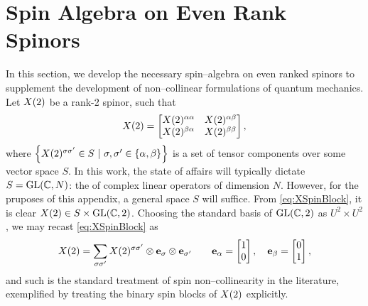 \chapter{Spin Algebra on Even Rank Spinors}
\label{apx:SpinorOp}

In this section, we develop the necessary spin--algebra on even ranked spinors to supplement the development 
of non--collinear formulations of quantum mechanics.
Let $\spinor{2}{X}$ be a rank-2 spinor, such that
\begin{equation}
\label{eq:XSpinBlock}
\spinor{2}{X} = 
  \begin{bmatrix}
    \spinor{2}{X}^{\alpha\alpha} & \spinor{2}{X}^{\alpha\beta} \\
    \spinor{2}{X}^{\beta\alpha}  & \spinor{2}{X}^{\beta\beta} \\
  \end{bmatrix}, 
\end{equation}
where $\left\lbrace\spinor{2}{X}^{\sigma\sigma'} \in S
\text{ }\vert\text{ } \sigma,\sigma' \in \{\alpha,\beta\} \right\rbrace$ is a
set of tensor components over some vector space $S$. In this work, the state of affairs will
typically dictate $S = \GL{C}{N}$: the  of complex linear operators of dimension $N$. However, 
for the pruposes of this appendix, a general space $S$ will suffice. From \cref{eq:XSpinBlock}, 
it is clear $\spinor{2}{X} \in S \times \GL{C}{2}$.
Choosing the standard basis of $\GL{C}{2}$ as $U^2 \times U^2$,
we may recast \cref{eq:XSpinBlock} as
\begin{equation}
\label{eq:XSpinComp}
  \spinor{2}{X} = \sum_{\sigma\sigma'} \spinor{2}{X}^{\sigma\sigma'} \otimes \mathbf{e}_\sigma \otimes \mathbf{e}_{\sigma'} 
  \qquad 
  \mathbf{e}_\alpha = \begin{bmatrix} 1 \\ 0 \end{bmatrix}, \quad 
  \mathbf{e}_\beta  = \begin{bmatrix} 0 \\ 1 \end{bmatrix},
\end{equation}
and such is the standard treatment of spin non--collinearity in the literature, exemplified by treating the binary spin 
blocks of $\spinor{2}{X}$ explicitly.

